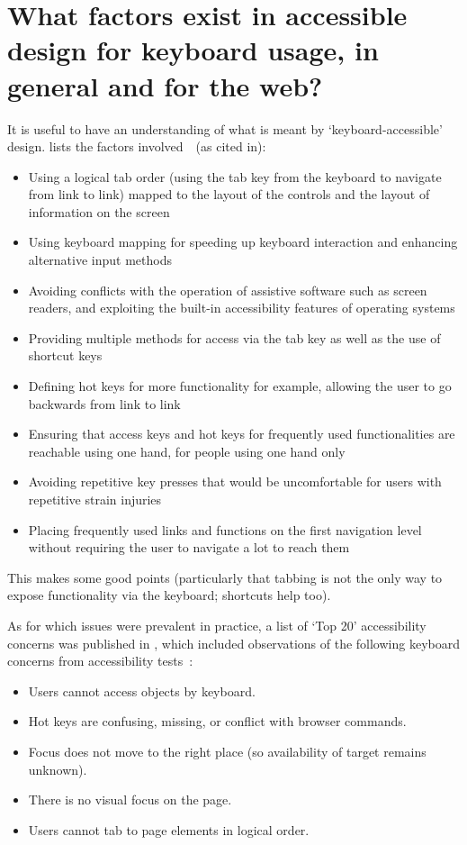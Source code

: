 \documentclass[11pt,openright,a4paper]{report}
\begin{document}
\section{What factors exist in accessible design for keyboard usage, in general and for the web?}
It is useful to have an understanding of what is meant by `keyboard-accessible' design. \citeauthor{deng} lists the factors involved~\cite{deng}~(as cited in\cite{dellaporta2007web}):
\begin{itemize}
\item Using a logical tab order (using the tab key from the keyboard to navigate from link to link) mapped to the layout of the controls and the layout of information on the screen
\item Using keyboard mapping for speeding up keyboard interaction and enhancing alternative input methods
\item Avoiding conflicts with the operation of assistive software such as screen readers, and exploiting the built-in accessibility features of operating systems
\item Providing multiple methods for access via the tab key as well as the use of shortcut keys
\item Defining hot keys for more functionality for example, allowing the user to go backwards from link to link
\item Ensuring that access keys and hot keys for frequently used functionalities are reachable using one hand, for people using one hand only
\item Avoiding repetitive key presses that would be uncomfortable for users with repetitive strain injuries
\item Placing frequently used links and functions on the first navigation level without requiring the user to navigate a lot to reach them
\end{itemize}
This makes some good points (particularly that tabbing is not the only way to expose functionality via the keyboard; shortcuts help too).

As for which issues were prevalent in practice, a list of `Top 20' accessibility concerns was published in \citeyear{hoffman2005emerging}, which included observations of the following keyboard concerns from accessibility tests~\cite{hoffman2005emerging}:
\begin{itemize}
\item Users cannot access objects by keyboard.
\item Hot keys are confusing, missing, or conflict with browser commands.
\item Focus does not move to the right place (so availability of target remains unknown).
\item There is no visual focus on the page.
\item Users cannot tab to page elements in logical order.
\end{itemize}
\end{document}
